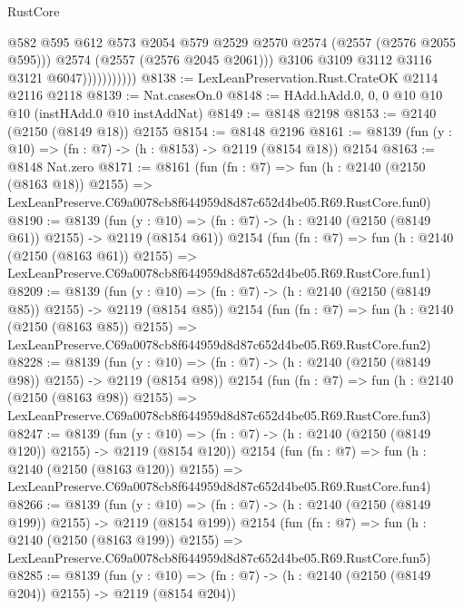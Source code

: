 \begin{lexlean}{RustCore}
\begin{coremodule}
                              @582
                              @595
                              @612
                              @573
                              @2054
                              @579
                              @2529
                              @2570
                              @2574
                              (@2557 (@2576 @2055 @595)))
                            @2574
                            (@2557 (@2576 @2045 @2061)))
                          @3106
                          @3109
                          @3112
                          @3116
                          @3121
                          @6047)))))))))))
@8138 := LexLeanPreservation.Rust.CrateOK @2114 @2116 @2118
@8139 := Nat.casesOn.{0}
@8148 := HAdd.hAdd.{0, 0, 0} @10 @10 @10 (instHAdd.{0} @10 instAddNat)
@8149 := @8148 @2198
@8153 := @2140 (@2150 (@8149 @18)) @2155
@8154 := @8148 @2196
@8161 := @8139 (fun (y : @10) => (fn : @7) -> (h : @8153) -> @2119 (@8154 @18)) @2154
@8163 := @8148 Nat.zero
@8171 := @8161
    (fun (fn : @7) =>
    fun (h : @2140 (@2150 (@8163 @18)) @2155) =>
    LexLeanPreserve.C69a0078cb8f644959d8d87c652d4be05.R69.RustCore.fun0)
@8190 := @8139
    (fun (y : @10) => (fn : @7) -> (h : @2140 (@2150 (@8149 @61)) @2155) -> @2119 (@8154 @61))
    @2154
    (fun (fn : @7) =>
    fun (h : @2140 (@2150 (@8163 @61)) @2155) =>
    LexLeanPreserve.C69a0078cb8f644959d8d87c652d4be05.R69.RustCore.fun1)
@8209 := @8139
    (fun (y : @10) => (fn : @7) -> (h : @2140 (@2150 (@8149 @85)) @2155) -> @2119 (@8154 @85))
    @2154
    (fun (fn : @7) =>
    fun (h : @2140 (@2150 (@8163 @85)) @2155) =>
    LexLeanPreserve.C69a0078cb8f644959d8d87c652d4be05.R69.RustCore.fun2)
@8228 := @8139
    (fun (y : @10) => (fn : @7) -> (h : @2140 (@2150 (@8149 @98)) @2155) -> @2119 (@8154 @98))
    @2154
    (fun (fn : @7) =>
    fun (h : @2140 (@2150 (@8163 @98)) @2155) =>
    LexLeanPreserve.C69a0078cb8f644959d8d87c652d4be05.R69.RustCore.fun3)
@8247 := @8139
    (fun (y : @10) => (fn : @7) -> (h : @2140 (@2150 (@8149 @120)) @2155) -> @2119 (@8154 @120))
    @2154
    (fun (fn : @7) =>
    fun (h : @2140 (@2150 (@8163 @120)) @2155) =>
    LexLeanPreserve.C69a0078cb8f644959d8d87c652d4be05.R69.RustCore.fun4)
@8266 := @8139
    (fun (y : @10) => (fn : @7) -> (h : @2140 (@2150 (@8149 @199)) @2155) -> @2119 (@8154 @199))
    @2154
    (fun (fn : @7) =>
    fun (h : @2140 (@2150 (@8163 @199)) @2155) =>
    LexLeanPreserve.C69a0078cb8f644959d8d87c652d4be05.R69.RustCore.fun5)
@8285 := @8139
    (fun (y : @10) => (fn : @7) -> (h : @2140 (@2150 (@8149 @204)) @2155) -> @2119 (@8154 @204))

\end{coremodule}
\end{lexlean}
